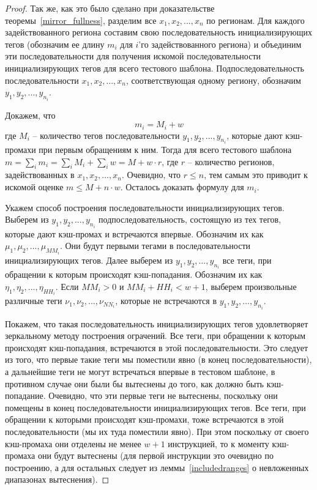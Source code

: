\theoremtext{\ref{thm_mirror_lenth_lru}}{\UpperBoundLRUMirror}
\begin{proof}
  Так же, как это было сделано при доказательстве
  теоремы~\ref{mirror_fullness}, разделим все $x_1, x_2, ..., x_n$
  по регионам. Для каждого задействованного региона составим свою
  последовательность инициализирующих тегов (обозначим ее длину $m_i$
  для $i$'го задействованного региона) и объединим эти
  последовательности для получения искомой последовательности
  инициализирующих тегов для всего тестового шаблона.
  Подпоследовательность последовательности $x_1, x_2, ..., x_n$,
  соответствующая одному региону, обозначим $y_1, y_2, ...,
  y_{n_i}$.

  Докажем, что $$m_i = M_i + w$$ где $M_i$ -- количество
  тегов последовательности $y_1, y_2, ..., y_{n_i}$, которые дают
  кэш-промахи при первым обращениям к ним. Тогда для всего тестового
  шаблона $m = \sum\limits_i m_i = \sum\limits_i M_i + \sum\limits_i w =
  M + w \cdot r$, где $r$ -- количество регионов, задействованных в
  $x_1, x_2, ..., x_n$. Очевидно, что $r \leqslant n$, тем самым это
  приводит к искомой оценке $m \leqslant M + n \cdot w$. Осталось
  доказать формулу для $m_i$.

  Укажем способ построения последовательности инициализирующих
  тегов. Выберем из $y_1, y_2, ..., y_{n_i}$ подпоследовательность,
  состоящую из тех тегов, которые дают кэш-промах и встречаются
  впервые. Обозначим их как $\mu_1, \mu_2, ..., \mu_{MM_i}$. Они будут первыми тегами в
  последовательности инициализирующих тегов. Далее выберем из $y_1, y_2, ..., y_{n_i}$
  все теги, при обращении к которым происходят кэш-попадания.
  Обозначим их как $\eta_1, \eta_2, ..., \eta_{HH_i}$. Если $MM_i > 0$ и $MM_i +
  HH_i < w + 1$, выберем произвольные различные теги $\nu_1, \nu_2,
  ..., \nu_{NN_i}$, которые не встречаются в $y_1, y_2, ...,
  y_{n_i}$.

  Покажем, что такая последовательность инициализирующих тегов
  удовлетворяет зеркальному методу построения ограчений. Все теги,
  при обращении к которым происходят кэш-попадания, встречаются в
  этой последовательности. Это следует из того, что первые такие
  теги мы поместили явно (в конец последовательности), а дальнейшие
  теги не могут встречаться впервые в тестовом шаблоне, в противном
  случае они были бы вытеснены до того, как должно быть
  кэш-попадание. Очевидно, что эти первые теги не вытеснены,
  поскольку они помещены в конец последовательности инициализирующих
  тегов. Все теги, при обращении к которыми происходят кэш-промахи,
  тоже встречаются в этой последовательности (мы их туда поместили
  явно). При этом поскольку от своего кэш-промаха они отделены не
  менее $w+1$ инструкцией, то к моменту кэш-промаха они будут
  вытеснены (для первой инструкции это очевидно по построению, а
  для остальных следует из леммы~\ref{includedranges} о невложенных диапазонах вытеснения).


\end{proof}
